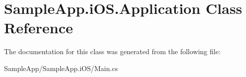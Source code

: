 \hypertarget{class_sample_app_1_1i_o_s_1_1_application}{}\section{Sample\+App.\+i\+O\+S.\+Application Class Reference}
\label{class_sample_app_1_1i_o_s_1_1_application}


The documentation for this class was generated from the following file\+:\begin{DoxyCompactItemize}
\item 
Sample\+App/\+Sample\+App.\+i\+O\+S/Main.\+cs\end{DoxyCompactItemize}
